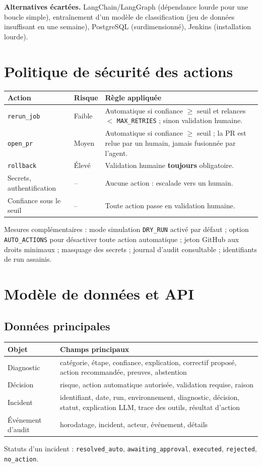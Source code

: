 \documentclass[11pt,a4paper]{article}
\newcommand{\code}[1]{\texttt{#1}}
\begin{document}
\textbf{Alternatives écartées.} LangChain/LangGraph (dépendance lourde pour une boucle simple),
entraînement d'un modèle de classification (jeu de données insuffisant en une semaine),
PostgreSQL (surdimensionné), Jenkins (installation lourde).

\section{Politique de sécurité des actions}
\begin{longtable}{p{3cm}p{1.8cm}p{9.7cm}}
\toprule
\textbf{Action} & \textbf{Risque} & \textbf{Règle appliquée} \\
\midrule\endhead
\code{rerun\_job} & Faible & Automatique si confiance $\geq$ seuil et relances $<$ \code{MAX\_RETRIES} ; sinon validation humaine. \\
\code{open\_pr} & Moyen & Automatique si confiance $\geq$ seuil ; la PR est relue par un humain, jamais fusionnée par l'agent. \\
\code{rollback} & Élevé & Validation humaine \textbf{toujours} obligatoire. \\
Secrets, authentification & -- & Aucune action : escalade vers un humain. \\
Confiance sous le seuil & -- & Toute action passe en validation humaine. \\
\bottomrule
\end{longtable}
Mesures complémentaires : mode simulation \code{DRY\_RUN} activé par défaut ; option \code{AUTO\_ACTIONS}
pour désactiver toute action automatique ; jeton GitHub aux droits minimaux ; masquage des secrets ;
journal d'audit consultable ; identifiants de run assainis.

\section{Modèle de données et API}
\subsection{Données principales}
\begin{longtable}{p{3cm}p{11.5cm}}
\toprule
\textbf{Objet} & \textbf{Champs principaux} \\
\midrule\endhead
Diagnostic & catégorie, étape, confiance, explication, correctif proposé, action recommandée, preuves, abstention \\
Décision & risque, action automatique autorisée, validation requise, raison \\
Incident & identifiant, date, run, environnement, diagnostic, décision, statut, explication LLM, trace des outils, résultat d'action \\
Événement d'audit & horodatage, incident, acteur, événement, détails \\
\bottomrule
\end{longtable}
Statuts d'un incident : \code{resolved\_auto}, \code{awaiting\_approval}, \code{executed}, \code{rejected}, \code{no\_action}.
\end{document}
